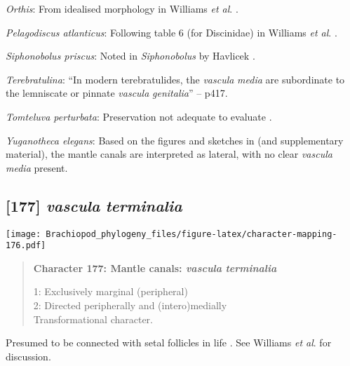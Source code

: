 \documentclass[openany]{book}
\theoremstyle{definition}
\theoremstyle{definition}
\theoremstyle{definition}
\theoremstyle{remark}
\begin{document}
\hypertarget{Orthis-coding-176}{}
\emph{Orthis}: From idealised morphology in Williams \emph{et al}.
\citeyearpar{Williams2000LinguliformeaCraniiformea}.

\hypertarget{Pelagodiscus_atlanticus-coding-176}{}
\emph{Pelagodiscus atlanticus}: Following table 6 (for Discinidae) in
Williams \emph{et al}.
\citeyearpar{Williams2000LinguliformeaCraniiformea}.

\hypertarget{Siphonobolus_priscus-coding-176}{}
\emph{Siphonobolus priscus}: Noted in \emph{Siphonobolus} by Havlicek
\citeyearpar{Havlicek1982LingulaceaPaterinacea}.

\hypertarget{Terebratulina-coding-176}{}
\emph{Terebratulina}: ``In modern terebratulides, the \emph{vascula}
\emph{media} are subordinate to the lemniscate or pinnate \emph{vascula}
\emph{genitalia}'' -- \citet{Williams1997Introduction} p417.

\hypertarget{Tomteluva_perturbata-coding-176}{}
\emph{Tomteluva perturbata}: Preservation not adequate to evaluate
\citep{Streng2016Anew}.

\hypertarget{Yuganotheca_elegans-coding-176}{}
\emph{Yuganotheca elegans}: Based on the figures and sketches in
\citet{Zhang2014Anearly} (and supplementary material), the mantle canals
are interpreted as lateral, with no clear \emph{vascula} \emph{media}
present.

\subsection*{\texorpdfstring{{[}177{]} \emph{vascula}
\emph{terminalia}}{{[}177{]} vascula terminalia}}\label{vascula-terminalia}

\texttt{[image: Brachiopod\_phylogeny\_files/figure-latex/character-mapping-176.pdf]}

\begin{quote}
\textbf{Character 177: Mantle canals: \emph{vascula} \emph{terminalia}}

1: Exclusively marginal (peripheral)\\
2: Directed peripherally and (intero)medially\\
Transformational character.
\end{quote}

Presumed to be connected with setal follicles in life
\citep{Williams1998Thediversity}. See Williams \emph{et al}.
\citeyearpar{Williams2000LinguliformeaCraniiformea} for discussion.
\end{document}
